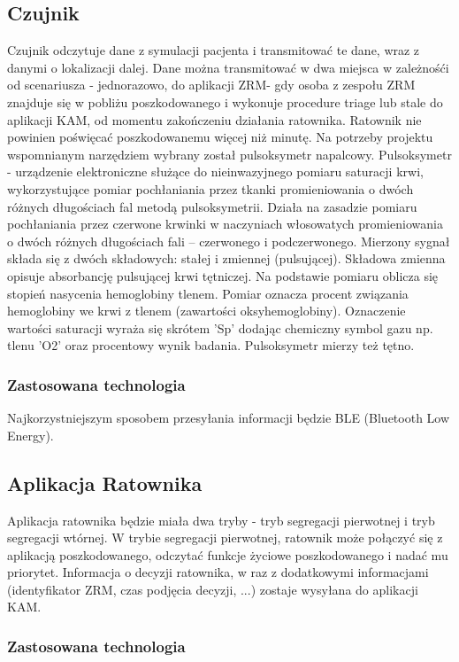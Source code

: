 \documentclass[11pt]{report}
\begin{document}
\subsection{Czujnik}
Czujnik odczytuje dane z symulacji pacjenta i transmitować te dane, wraz z danymi o lokalizacji dalej. Dane można transmitować w dwa miejsca w zależnośći od scenariusza - jednorazowo, do aplikacji ZRM- gdy osoba z zespołu ZRM znajduje się w pobliżu poszkodowanego i wykonuje procedure triage lub stale do aplikacji KAM, od momentu zakończeniu działania ratownika.
\noindent
Ratownik nie powinien poświęcać poszkodowanemu więcej niż minutę. Na potrzeby projektu wspomnianym narzędziem wybrany został pulsoksymetr napalcowy.
\noindent
Pulsoksymetr - urządzenie elektroniczne służące do nieinwazyjnego pomiaru saturacji krwi, wykorzystujące pomiar pochłaniania przez tkanki promieniowania 
o dwóch różnych długościach fal metodą pulsoksymetrii. Działa na zasadzie pomiaru pochłaniania przez czerwone krwinki w naczyniach włosowatych promieniowania o dwóch różnych długościach fali – czerwonego i podczerwonego. Mierzony sygnał składa się z dwóch składowych: stałej i zmiennej (pulsującej). Składowa zmienna opisuje absorbancję pulsującej krwi tętniczej. Na podstawie pomiaru oblicza się stopień nasycenia hemoglobiny tlenem. Pomiar oznacza procent związania hemoglobiny we krwi z tlenem (zawartości oksyhemoglobiny). Oznaczenie wartości saturacji wyraża się skrótem 'Sp' dodając chemiczny symbol gazu np. tlenu 'O2' oraz procentowy wynik badania. Pulsoksymetr mierzy też tętno.

\subsubsection{Zastosowana technologia}
Najkorzystniejszym sposobem przesyłania informacji będzie BLE (Bluetooth Low Energy).


\subsection{Aplikacja Ratownika}
Aplikacja ratownika będzie miała dwa tryby - tryb segregacji pierwotnej i tryb segregacji wtórnej. W trybie segregacji pierwotnej, ratownik może połączyć się z aplikacją poszkodowanego, odczytać funkcje życiowe poszkodowanego i nadać mu priorytet. Informacja o decyzji ratownika, w raz z dodatkowymi informacjami (identyfikator ZRM, czas podjęcia decyzji, ...) zostaje wysyłana do aplikacji KAM. 
\subsubsection{Zastosowana technologia}
\end{document}
